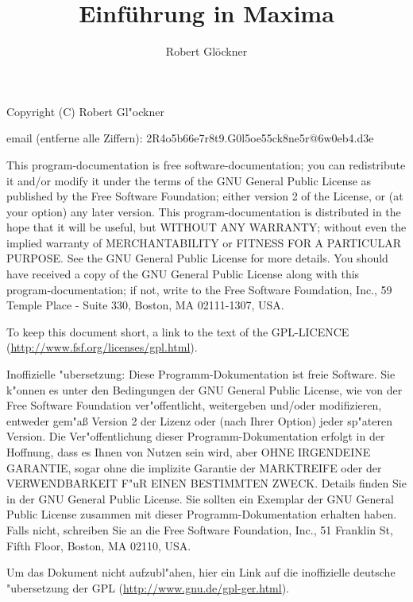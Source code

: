 \documentclass[ngerman,12pt,a4paper]{article}
\title{\textbf{Einf\"{u}hrung in Maxima}}
\author{Robert Gl\"{o}ckner}
\begin{document}
\maketitle

\tableofcontents

\newpage
\pagestyle{empty}
Copyright (C) Robert Gl"ockner

email (entferne alle Ziffern): 2R4o5b66e7r8t9.G0l5oe55ck8ne5r@6w0eb4.d3e

\vspace{1cm}

{\scriptsize
This program-documentation is free software-documentation; you can redistribute it and/or modify it under the terms of the GNU General Public License as published by the Free Software Foundation; either version 2 of the License, or (at your option) any later version.
This program-documentation is distributed in the hope that it will be useful, but WITHOUT ANY WARRANTY; without even the implied warranty of MERCHANTABILITY or FITNESS FOR A PARTICULAR PURPOSE\@. See the GNU General Public License for more details.
You should have received a copy of the GNU General Public License along with this program-documentation; if not, write to the Free Software Foundation, Inc., 59 Temple Place - Suite 330, Boston, MA 02111-1307, USA.

To keep this document short, a link to the text of the GPL-LICENCE (\url{http://www.fsf.org/licenses/gpl.html}).

\vspace{1cm}

Inoffizielle "ubersetzung: Diese Programm-Dokumentation ist freie Software. Sie k"onnen es unter den Bedingungen der GNU General Public License, wie von der Free Software Foundation ver"offentlicht, weitergeben und/oder modifizieren, entweder gem"a{\ss} Version 2 der Lizenz oder (nach Ihrer Option) jeder sp"ateren Version.
Die Ver"offentlichung dieser Programm-Dokumentation erfolgt in der Hoffnung, dass es Ihnen von Nutzen sein wird, aber OHNE IRGENDEINE GARANTIE, sogar ohne die implizite Garantie der MARKTREIFE oder der VERWENDBARKEIT F"uR EINEN BESTIMMTEN ZWECK\@. Details finden Sie in der GNU General Public License.
Sie sollten ein Exemplar der GNU General Public License zusammen mit dieser Programm-Dokumentation erhalten haben. Falls nicht, schreiben Sie an die Free Software Foundation, Inc., 51 Franklin St, Fifth Floor, Boston, MA 02110, USA.

Um das Dokument nicht aufzubl"ahen, hier ein Link auf die inoffizielle deutsche "ubersetzung der GPL (\url{http://www.gnu.de/gpl-ger.html}).
}
\end{document}
